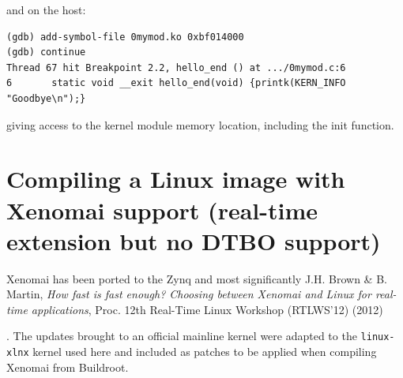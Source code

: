 \documentclass{article}
\begin{document}
{{{\noindent and on the host:

\begin{verbatim}
(gdb) add-symbol-file 0mymod.ko 0xbf014000
(gdb) continue
Thread 67 hit Breakpoint 2.2, hello_end () at .../0mymod.c:6
6       static void __exit hello_end(void) {printk(KERN_INFO "Goodbye\n");}
\end{verbatim}

\noindent giving access to the kernel module memory location, including the init function.





\section{Compiling a Linux image with Xenomai support (real-time extension but no DTBO 
support)}\label{xe}

Xenomai has been ported to the Zynq
and most significantly J.H. Brown \& B. Martin, {\em How fast is fast enough? Choosing between 
Xenomai and Linux for real-time applications}, Proc. 12th Real-Time Linux 
Workshop (RTLWS’12) (2012)}. The updates brought to an official mainline kernel were adapted
to the {\tt linux-xlnx} kernel used here and included as patches to be applied when compiling
Xenomai from Buildroot.

%

}}
\end{document}
